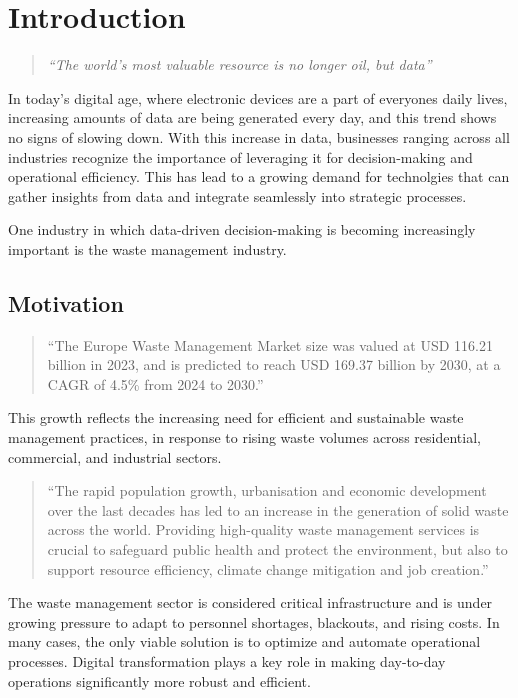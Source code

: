 \documentclass[a4paper,12pt,twoside]{scrreprt}
\begin{document}
\chapter{Introduction}

\begin{quote}
  \textit{``The world's most valuable resource is no longer oil, but data''}
  \cite{noauthor_worlds_nodate}
\end{quote}
In today's digital age, where electronic devices are a part of everyones daily
lives, increasing amounts of data
are being generated every day, and this trend shows no signs of slowing down.
\cite{petroc_data_nodate}
With this increase in data, businesses ranging across all industries recognize
the importance of leveraging it for decision-making and operational efficiency.
This has lead to a growing demand for technolgies that can gather insights from
data and integrate seamlessly into strategic processes.

One industry in which data-driven decision-making is becoming increasingly
important is the
waste management industry.

\section{Motivation}
\begin{quote}
  ``The Europe Waste Management Market size was valued at USD 116.21
  billion in
  2023, and is predicted to reach USD 169.37 billion by 2030, at a CAGR of
  4.5\% from 2024 to 2030.''\cite{noauthor_europe_nodate}
\end{quote}

This growth reflects the increasing need for efficient and sustainable waste
management practices, in response to rising waste volumes across residential,
commercial, and industrial sectors.

\begin{quote}
  ``The rapid population growth, urbanisation and economic development over the
  last decades has led to an increase in the generation of solid waste across
  the
  world. Providing high-quality waste management services is crucial to
  safeguard
  public health and protect the environment, but also to support resource
  efficiency, climate change mitigation and job creation.''
  \cite{noauthor_solid_nodate}
\end{quote}

The waste management sector is considered critical infrastructure and is under
growing pressure to adapt to personnel shortages, blackouts, and rising costs.
In many cases, the only viable solution is to optimize and automate operational
processes. Digital transformation plays a key role in making day-to-day
operations significantly more robust and
efficient.\cite{noauthor_gemeinsam_nodate}
\end{document}
